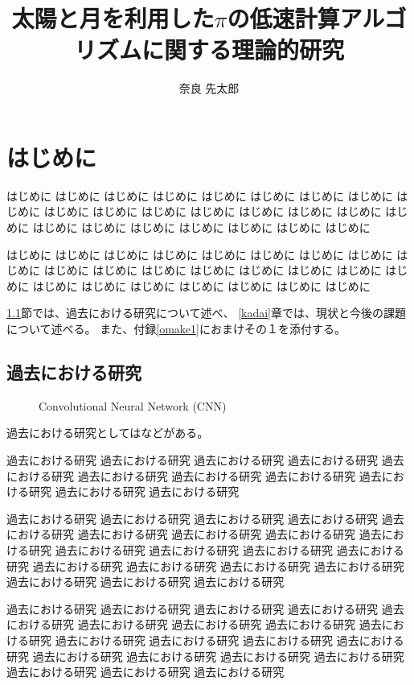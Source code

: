\documentclass[12pt]{article} %
\title{太陽と月を利用した$\pi$の低速計算アルゴリズムに関する理論的研究}
\author{奈良 先太郎}
\begin{document}
%
%
\titlepage
\cmemberspage
\firstabstract
\secondabstract
%
%
\toc
\newpage
\listoffigures
\listoftables
%
%
\newpage
\section{はじめに}

はじめに はじめに はじめに はじめに はじめに はじめに はじめに はじめに 
はじめに はじめに はじめに はじめに はじめに はじめに はじめに はじめに 
はじめに はじめに はじめに はじめに はじめに はじめに はじめに はじめに 

はじめに はじめに はじめに はじめに はじめに はじめに はじめに はじめに 
はじめに はじめに はじめに はじめに はじめに はじめに はじめに はじめに 
はじめに はじめに はじめに はじめに はじめに はじめに はじめに はじめに 

\ref{kako}節では、過去における研究について述べ、
\ref{kadai}章では、現状と今後の課題について述べる。
また、付録\ref{omake1}におまけその１を添付する。


\subsection{過去における研究}
\label{kako}


\begin{figure*}[t]
 \centering
 \caption{Convolutional Neural Network (CNN)}
 \label{fig:CNN}
\end{figure*}

過去における研究としては\cite{alex_nips12}などがある。

過去における研究 過去における研究 過去における研究 
過去における研究 過去における研究 過去における研究 過去における研究 
過去における研究 過去における研究 過去における研究 過去における研究 

過去における研究 過去における研究 過去における研究 過去における研究 
過去における研究 過去における研究 過去における研究 過去における研究 
過去における研究 過去における研究 過去における研究 過去における研究 
過去における研究 過去における研究 過去における研究 過去における研究 
過去における研究 過去における研究 過去における研究 過去における研究 

過去における研究 過去における研究 過去における研究 過去における研究 
過去における研究 過去における研究 過去における研究 過去における研究 
過去における研究 過去における研究 過去における研究 過去における研究 
過去における研究 過去における研究 過去における研究 過去における研究 
過去における研究 過去における研究 過去における研究 過去における研究 
\end{document}
